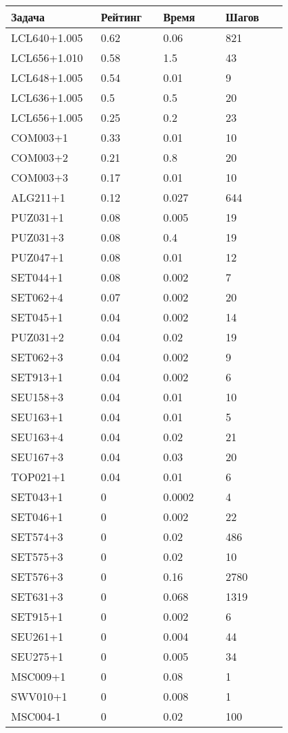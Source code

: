 \begin{longtable}[H]{|p{0.2\linewidth}|p{0.2\linewidth}|p{0.2\linewidth}|p{0.2\linewidth}|}
\hline
\textbf{Задача} & \textbf{Рейтинг} & \textbf{Время} & \textbf{Шагов} \\
\hline
LCL640+1.005 &  0.62 &  0.06 &  821 \\
\hline
LCL656+1.010 &  0.58 &  1.5 &  43 \\
\hline
LCL648+1.005 &  0.54 &  0.01 &  9 \\
\hline
LCL636+1.005 &  0.5 &  0.5 &  20 \\
\hline
LCL656+1.005 &  0.25 &  0.2 &  23 \\
\hline
COM003+1 &  0.33 &  0.01 &  10 \\
\hline
COM003+2 &  0.21 &  0.8 &  20 \\
\hline
COM003+3 &  0.17 &  0.01 &  10 \\
\hline
ALG211+1 &  0.12 &  0.027 &  644 \\
\hline
PUZ031+1 &  0.08 &  0.005 &  19 \\
\hline
PUZ031+3 &  0.08 &  0.4 &  19 \\
\hline
PUZ047+1 &  0.08 &  0.01 &  12 \\
\hline
SET044+1 &  0.08 &  0.002 &  7 \\
\hline
SET062+4 &  0.07 &  0.002 &  20 \\
\hline
SET045+1 &  0.04 &  0.002 &  14 \\
\hline
PUZ031+2 &  0.04 &  0.02 &  19 \\
\hline
SET062+3 &  0.04 &  0.002 &  9 \\
\hline
SET913+1 &  0.04 &  0.002 &  6 \\
\hline
SEU158+3 &  0.04 &  0.01 &  10 \\
\hline
SEU163+1 &  0.04 &  0.01 &  5 \\
\hline
SEU163+4 &  0.04 &  0.02 &  21 \\
\hline
SEU167+3 &  0.04 &  0.03 &  20 \\
\hline
TOP021+1 &  0.04 &  0.01 &  6 \\
\hline
SET043+1 &  0 &  0.0002 &  4 \\
\hline
SET046+1 &  0 &  0.002 &  22 \\
\hline
SET574+3 &  0 &  0.02 &  486 \\
\hline
SET575+3 &  0 &  0.02 &  10 \\
\hline
SET576+3 &  0 &  0.16 &  2780 \\
\hline
SET631+3 &  0 &  0.068 &  1319 \\
\hline
SET915+1 &  0 &  0.002 &  6 \\
\hline
SEU261+1 &  0 &  0.004 &  44 \\
\hline
SEU275+1 &  0 &  0.005 &  34 \\
\hline
MSC009+1 &  0 &  0.08 &  1  \\
\hline
SWV010+1 &  0 & 0.008 &  1  \\
\hline
MSC004-1 &  0 &  0.02 &  100 \\
\hline
\end{longtable}


